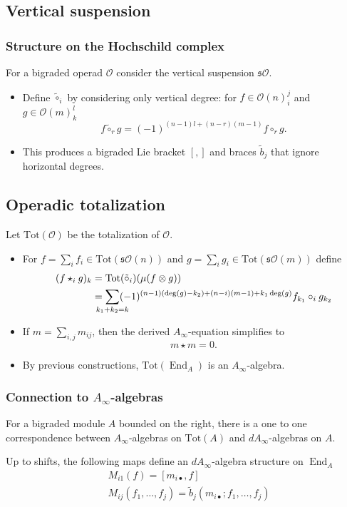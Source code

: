 \documentclass{beamer}
\theoremstyle{definition}
\newcommand{\OO}{\mathcal{O}}
\newcommand{\Tot}{\mathrm{Tot}}
\newcommand{\s}{\mathfrak{s}}
\DeclareMathOperator{\End}{End}
\begin{document}
\subsection{Vertical suspension}

\begin{frame}
\frametitle{Structure on the Hochschild complex}
For a bigraded operad $\OO$ consider the vertical suspension $\s\OO$.
\begin{itemize}
\item<1-> Define $\tilde{\circ}_i$ by considering only vertical degree: for $f\in \OO(n)^j_i$ and $g\in \OO(m)^l_k$
\[f\tilde{\circ}_rg=(-1)^{(n-1)l+(n-r)(m-1)}f\circ_r g.\]
\item<2-> This produces a bigraded Lie bracket $[,]$ and braces $\tilde{b}_j$ that ignore horizontal degrees.

\end{itemize}
\end{frame}

\subsection{Operadic totalization}


\begin{frame}
Let $\Tot(\OO)$ be the totalization of $\OO$.
\begin{itemize}
\item<1-> For $f=\sum_i f_i\in \Tot(\s\OO(n))$ and $g=\sum_i g_i\in \Tot(\s\OO(m))$ define %
\begin{align*}
(f\star_ig)_k&= \Tot(\tilde{\circ}_i)(\mu(f\otimes g))\\
			 &=\sum_{\mathclap{k_1+k_2=k}} (-1)^{(n-1)(\deg(g)-k_2)+(n-i)(m-1)+k_1\deg(g)}f_{k_1}\circ_i g_{k_2}
\end{align*}

\item<2-> If $m=\sum_{i,j} m_{ij}$, then the derived $A_\infty$-equation simplifies to 
\[m\star m = 0.\]
\item<3-> By previous constructions, $\Tot(\End_A)$ is an $A_\infty$-algebra.
\end{itemize}
\end{frame}


\begin{frame}
\frametitle{Connection to $A_\infty$-algebras}
\begin{theorem}
For a bigraded module $A$ bounded on the right, there is a one to one correspondence between $A_\infty$-algebras on $\Tot(A)$ and $dA_\infty$-algebras on $A$.
\end{theorem}\pause
\begin{corollary}
Up to shifts, the following maps define an $dA_\infty$-algebra structure on $\End_A$
\begin{align*}
&M_{i1}(f)=[m_{i\bullet},f]\\
&M_{ij}(f_1,\dots, f_j)=\tilde{b}_j(m_{i\bullet};f_1,\dots, f_j)
\end{align*}
\end{corollary}

\end{frame}
\end{document}
